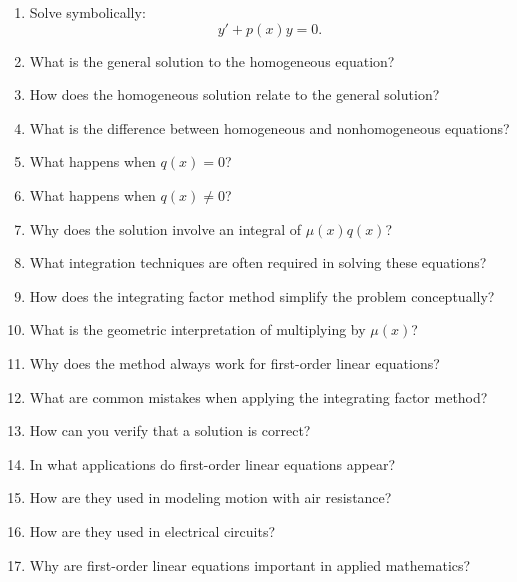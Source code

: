 \begin{enumerate}
\item Solve symbolically:
  \[
    y' + p(x)y = 0.
  \]

\item What is the general solution to the homogeneous equation?

\item How does the homogeneous solution relate to the general solution?

\item What is the difference between homogeneous and nonhomogeneous equations?

\item What happens when $q(x)=0$?

\item What happens when $q(x)\neq 0$?

\item Why does the solution involve an integral of $\mu(x)q(x)$?

\item What integration techniques are often required in solving these equations?

\item How does the integrating factor method simplify the problem conceptually?

\item What is the geometric interpretation of multiplying by $\mu(x)$?

\item Why does the method always work for first-order linear equations?

\item What are common mistakes when applying the integrating factor method?

\item How can you verify that a solution is correct?

\item In what applications do first-order linear equations appear?

\item How are they used in modeling motion with air resistance?

\item How are they used in electrical circuits?

\item Why are first-order linear equations important in applied mathematics?

\end{enumerate}
